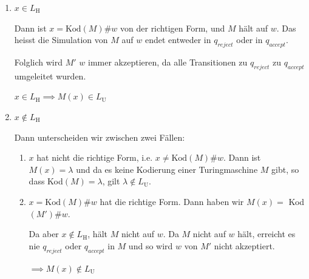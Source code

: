 \documentclass[a4paper, 11pt]{article}
\begin{document}
                        \begin{enumerate}[label=(\roman*)]
                            \item $x \in L_{\text{H}}$
                
                                Dann ist $x = \text{Kod}(M)\#w$ von der richtigen Form, und $M$ hält auf $w$. 
                                Das heisst die Simulation von $M$ auf $w$ endet entweder in $q_{reject}$ oder in $q_{accept}$. 
                                
                                Folglich wird $M'$ $w$ immer akzeptieren, da alle Transitionen zu $q_{reject}$ zu $q_{accept}$ umgeleitet wurden. 
                                
                                $x \in L_{\text{H}} \implies M(x) \in L_{\text{U}}$
                
                            \item $x \notin L_{\text{H}}$
                
                                Dann unterscheiden wir zwischen zwei Fällen:
                
                                \begin{enumerate}[label=(\alph*)]
                                    \item 
                                    
                                    $x$ hat nicht die richtige Form, i.e. $x \neq \text{Kod}(M)\#w$.
                                    Dann ist $M(x) = \lambda$ und da es keine Kodierung einer Turingmaschine $M$ gibt, so dass Kod$(M) = \lambda$, gilt   $\lambda \notin L_{\text{U}}$.
                            
                
                   
                    \item
                
                                    $x = \text{Kod}(M)\#w$ hat die richtige Form. Dann haben wir $M(x) = $ Kod$(M')\#w$.
                                    
                                    Da aber $x \notin L_{\text{H}}$, hält $M$ nicht auf $w$. Da $M$ nicht auf $w$ hält, erreicht es nie $q_{reject}$ oder $q_{accept}$ in $M$ und so wird $w$ von $M'$ nicht akzeptiert. 
                
                                    $\implies M(x) \notin L_{\text{U}}$
                

\end{enumerate}
\end{enumerate}
\end{document}
